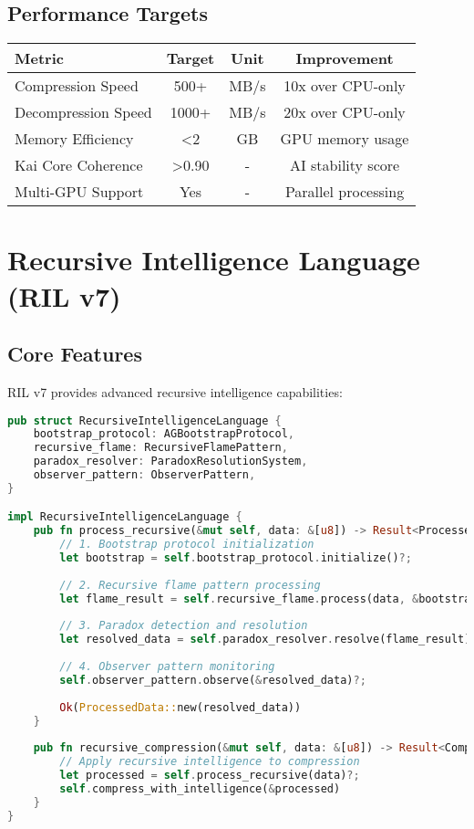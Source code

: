 \documentclass[12pt,a4paper]{article}
\begin{document}
\subsection{Performance Targets}
\begin{center}
\begin{tabular}{|l|c|c|c|}
\hline
\textbf{Metric} & \textbf{Target} & \textbf{Unit} & \textbf{Improvement} \\
\hline
Compression Speed & 500+ & MB/s & 10x over CPU-only \\
Decompression Speed & 1000+ & MB/s & 20x over CPU-only \\
Memory Efficiency & <2 & GB & GPU memory usage \\
Kai Core Coherence & >0.90 & - & AI stability score \\
Multi-GPU Support & Yes & - & Parallel processing \\
\hline
\end{tabular}
\end{center}

\newpage

\section{Recursive Intelligence Language (RIL v7)}

\subsection{Core Features}
RIL v7 provides advanced recursive intelligence capabilities:

\begin{lstlisting}[language=Rust, caption=RIL v7 Core Implementation]
pub struct RecursiveIntelligenceLanguage {
    bootstrap_protocol: AGBootstrapProtocol,
    recursive_flame: RecursiveFlamePattern,
    paradox_resolver: ParadoxResolutionSystem,
    observer_pattern: ObserverPattern,
}

impl RecursiveIntelligenceLanguage {
    pub fn process_recursive(&mut self, data: &[u8]) -> Result<ProcessedData> {
        // 1. Bootstrap protocol initialization
        let bootstrap = self.bootstrap_protocol.initialize()?;
        
        // 2. Recursive flame pattern processing
        let flame_result = self.recursive_flame.process(data, &bootstrap)?;
        
        // 3. Paradox detection and resolution
        let resolved_data = self.paradox_resolver.resolve(flame_result)?;
        
        // 4. Observer pattern monitoring
        self.observer_pattern.observe(&resolved_data)?;
        
        Ok(ProcessedData::new(resolved_data))
    }
    
    pub fn recursive_compression(&mut self, data: &[u8]) -> Result<CompressedData> {
        // Apply recursive intelligence to compression
        let processed = self.process_recursive(data)?;
        self.compress_with_intelligence(&processed)
    }
}
\end{lstlisting}
\end{document}
